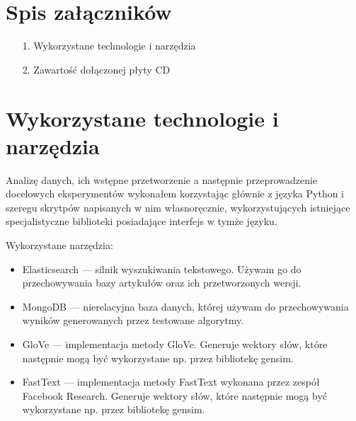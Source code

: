\documentclass[pl]{minipw} %
\begin{document}



\listoffigures


\renewcommand{\listtablename}{Spis tabel}
\listoftables


\chapter*{Spis załączników}
\begin{enumerate}
\item[1.] Wykorzystane technologie i narzędzia
\item[2.] Zawartość dołączonej płyty CD
\end{enumerate}

\newpage
\pagestyle{empty}
\appendix
\chapter{Wykorzystane technologie i narzędzia}
Analizę danych, ich wstępne przetworzenie a następnie przeprowadzenie docelowych eksperymentów wykonałem korzystając głównie z języka Python i szeregu skrytpów napisanych w nim własnoręcznie, wykorzystujących istniejące specjalistyczne biblioteki posiadające interfejs w tymże języku.

Wykorzystane narzędzia:
\begin{itemize}
	\item Elasticsearch --- silnik wyszukiwania tekstowego. Używam go do przechowywania bazy artykułów oraz ich przetworzonych wersji.
	\item MongoDB --- nierelacyjna baza danych, której używam do przechowywania wyników generowanych przez testowane algorytmy.
	\item GloVe --- implementacja metody GloVe. Generuje wektory słów, które następnie mogą być wykorzystane np. przez bibliotekę gensim.
	\item FastText --- implementacja metody FastText wykonana przez zespół Facebook Research. Generuje wektory słów, które następnie mogą być wykorzystane np. przez bibliotekę gensim.
\end{itemize}
\end{document}
